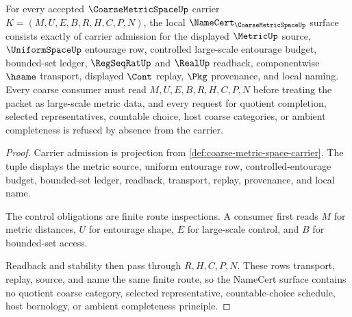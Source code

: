 \begin{theorem}
\label{thm:coarse-metric-space-namecert-obligations}
For every accepted $\CoarseMetricSpaceUp$ carrier $K=(M,U,E,B,R,H,C,P,N)$, the local $\NameCert_{\CoarseMetricSpaceUp}$ surface consists exactly of carrier admission for the displayed $\MetricUp$ source, $\UniformSpaceUp$ entourage row, controlled large-scale entourage budget, bounded-set ledger, $\RegSeqRatUp$ and $\RealUp$ readback, componentwise $\hsame$ transport, displayed $\Cont$ replay, $\Pkg$ provenance, and local naming. Every coarse consumer must read $M,U,E,B,R,H,C,P,N$ before treating the packet as large-scale metric data, and every request for quotient completion, selected representatives, countable choice, host coarse categories, or ambient completeness is refused by absence from the carrier.
\end{theorem}
\begin{proof}
Carrier admission is projection from \autoref{def:coarse-metric-space-carrier}. The tuple displays the metric source, uniform entourage row, controlled-entourage budget, bounded-set ledger, readback, transport, replay, provenance, and local name.

The control obligations are finite route inspections. A consumer first reads $M$ for metric distances, $U$ for entourage shape, $E$ for large-scale control, and $B$ for bounded-set access.

Readback and stability then pass through $R,H,C,P,N$. These rows transport, replay, source, and name the same finite route, so the NameCert surface contains no quotient coarse category, selected representative, countable-choice schedule, host bornology, or ambient completeness principle.
\end{proof}


